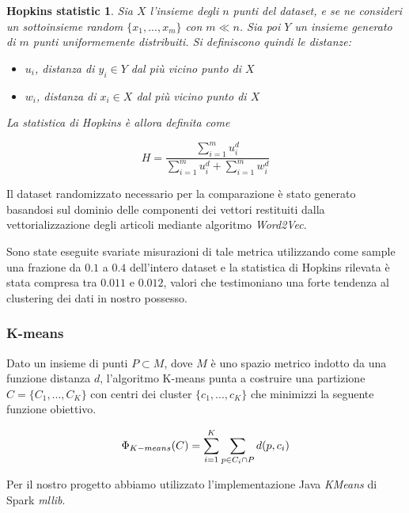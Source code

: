 \documentclass[
	11pt, %
	a4paper, %
	oneside, %
	headinclude,footinclude, %
	BCOR5mm, %
]{scrartcl}
\newtheorem*{hopkins}{Hopkins statistic} %
\begin{document}
			\vspace{5mm}
			\hfill\begin{minipage}{\dimexpr\textwidth-1cm}
			\begin{hopkins}
				Sia $X$ l'insieme degli $n$ punti del dataset, e se ne consideri un sottoinsieme random $\{x_1,...,x_m\}$ con $m \ll n$.
				Sia poi $Y$ un insieme generato di $m$ punti uniformemente distribuiti.
				Si definiscono quindi le distanze:
				\begin{itemize}
					\item $u_i$, distanza di $y_i \in Y$ dal più vicino punto di $X$
					\item $w_i$, distanza di $x_i \in X$ dal più vicino punto di $X$
				\end{itemize}
				La statistica di Hopkins è allora definita come
				
				$$H=\frac{\sum_{i=1}^m{u_i^d}}{\sum_{i=1}^m{u_i^d}+\sum_{i=1}^m{w_i^d}}$$
			\end{hopkins}
			\xdef\tpd{\the\prevdepth}
			\end{minipage}
			\vspace{5mm}
			
			Il dataset randomizzato necessario per la comparazione è stato generato basandosi sul dominio delle componenti dei vettori restituiti dalla vettorializzazione degli articoli mediante algoritmo \emph{Word2Vec}.

			Sono state eseguite svariate misurazioni di tale metrica utilizzando come sample una frazione da $0.1$ a $0.4$ dell'intero dataset e la statistica di Hopkins rilevata è stata compresa tra $0.011$ e $0.012$, valori che testimoniano una forte tendenza al clustering dei dati in nostro possesso.

		\subsubsection{K-means}
			Dato un insieme di punti $P \subset M$, dove $M$ è uno spazio metrico indotto da una funzione distanza $d$, l'algoritmo K-means punta a costruire una partizione $C = \{ C_1, ..., C_K \}$ con centri dei cluster $\{ c_1, ..., c_K\}$ che minimizzi la seguente funzione obiettivo.

			\begin{equation}
				\Phi_{K-means} (C) = \sum_{i=1}^K \sum_{p \in C_i \cap P} d(p, c_i) \\
			\end{equation}

			Per il nostro progetto abbiamo utilizzato l'implementazione Java \emph{KMeans} di Spark \emph{mllib}.
\end{document}
